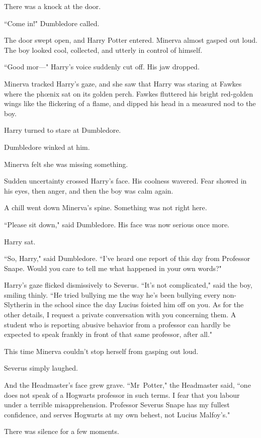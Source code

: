 There was a knock at the door.

``Come in!" Dumbledore called.

The door swept open, and Harry Potter entered. Minerva almost gasped out loud. The boy looked cool, collected, and utterly in control of himself.

``Good mor—" Harry's voice suddenly cut off. His jaw dropped.

Minerva tracked Harry's gaze, and she saw that Harry was staring at Fawkes where the phœnix sat on its golden perch. Fawkes fluttered his bright red-golden wings like the flickering of a flame, and dipped his head in a measured nod to the boy.

Harry turned to stare at Dumbledore.

Dumbledore winked at him.

Minerva felt she was missing something.

Sudden uncertainty crossed Harry's face. His coolness wavered. Fear showed in his eyes, then anger, and then the boy was calm again.

A chill went down Minerva's spine. Something was not right here.

``Please sit down," said Dumbledore. His face was now serious once more.

Harry sat.

``So, Harry," said Dumbledore. ``I've heard one report of this day from Professor Snape. Would you care to tell me what happened in your own words?"

Harry's gaze flicked dismissively to Severus. ``It's not complicated," said the boy, smiling thinly. ``He tried bullying me the way he's been bullying every non-Slytherin in the school since the day Lucius foisted him off on you. As for the other details, I request a private conversation with you concerning them. A student who is reporting abusive behavior from a professor can hardly be expected to speak frankly in front of that same professor, after all."

This time Minerva couldn't stop herself from gasping out loud.

Severus simply laughed.

And the Headmaster's face grew grave. ``Mr~Potter," the Headmaster said, ``one does not speak of a Hogwarts professor in such terms. I fear that you labour under a terrible misapprehension. Professor Severus Snape has my fullest confidence, and serves Hogwarts at my own behest, not Lucius Malfoy's."

There was silence for a few moments.

